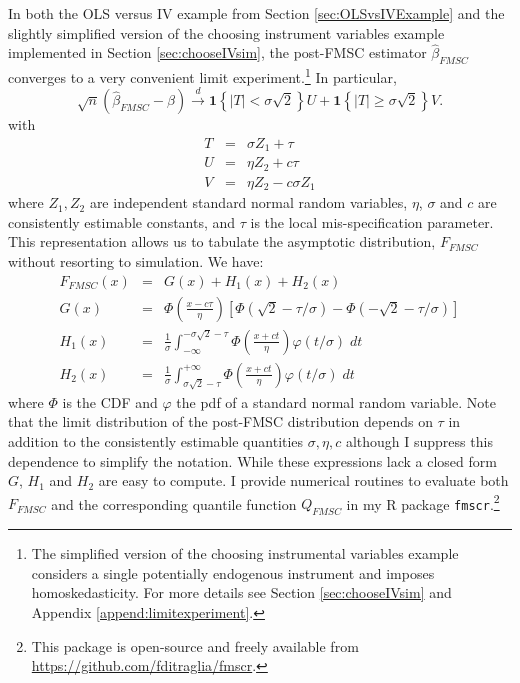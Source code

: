 In both the OLS versus IV example from Section \ref{sec:OLSvsIVExample} and the slightly simplified version of the choosing instrument variables example implemented in Section \ref{sec:chooseIVsim}, the post-FMSC estimator $\widehat{\beta}_{FMSC}$ converges to a very convenient limit experiment.\footnote{The simplified version of the choosing instrumental variables example considers a single potentially endogenous instrument and imposes homoskedasticity.
  For more details see Section \ref{sec:chooseIVsim} and Appendix \ref{append:limitexperiment}.}
In particular, 
\begin{equation}
  \sqrt{n}(\widehat{\beta}_{FMSC} - \beta) \overset{d}{\rightarrow}  \mathbf{1}\left\{ |T|<\sigma \sqrt{2} \right\} U +  \mathbf{1}\left\{ |T|\geq\sigma \sqrt{2} \right\} V.
  \label{eq:FMSCLimitExperiment}
\end{equation}
with
\begin{eqnarray*}
  T &=& \sigma Z_1 + \tau\\
  U &=& \eta Z_2 + c\tau\\
  V &=& \eta Z_2 - c\sigma Z_1
\end{eqnarray*}
where $Z_1, Z_2$ are independent standard normal random variables, $\eta$, $\sigma$ and $c$ are consistently estimable constants, and $\tau$ is the local mis-specification parameter.
This representation allows us to tabulate the asymptotic distribution, $F_{FMSC}$ without resorting to simulation.
We have:
\begin{eqnarray}
  F_{FMSC}(x) &=& G(x) + H_1(x) + H_2(x) \\
  \label{eq:FFMSC}
  G(x) &=& \Phi\left( \frac{x - c\tau}{\eta} \right)\left[ \Phi( \sqrt{2} - \tau/\sigma) -  \Phi( -\sqrt{2} - \tau/\sigma )\right]\\
  \label{eq:GFMSC}
  H_1(x) &=& \frac{1}{\sigma}\int_{-\infty}^{-\sigma\sqrt{2} - \tau} \Phi\left( \frac{x + ct}{\eta}\right)\varphi(t/\sigma)\; dt\\
  \label{eq:H1FMSC}
  H_2(x) &=& \frac{1}{\sigma}\int^{+\infty}_{\sigma\sqrt{2} - \tau} \Phi\left( \frac{x + ct}{\eta}\right)\varphi(t/\sigma)\; dt
  \label{eq:H2FMSC}
\end{eqnarray}
where $\Phi$ is the CDF and $\varphi$ the pdf of a standard normal random variable.
Note that the limit distribution of the post-FMSC distribution depends on $\tau$ in addition to the consistently estimable quantities $\sigma, \eta, c$ although I suppress this dependence to simplify the notation.
While these expressions lack a closed form $G$, $H_1$ and $H_2$ are easy to compute.
I provide numerical routines to evaluate both $F_{FMSC}$ and the corresponding quantile function $Q_{FMSC}$ 
in my R package \texttt{fmscr}.\footnote{This package is open-source and freely available from \url{https://github.com/fditraglia/fmscr}.}

